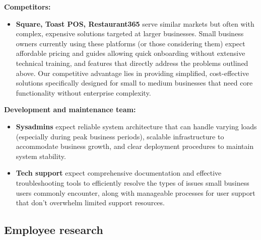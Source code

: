 \documentclass[]{VUMIFTemplateClass}
\begin{document}
\textbf{Competitors:}
\begin{itemize}
    \item \textbf{Square, Toast POS, Restaurant365} serve similar markets but
    often with complex, expensive solutions targeted at larger businesses. Small
    business owners currently using these platforms (or those considering them)
    expect affordable pricing and guides allowing quick onboarding
    without extensive technical training, and features that directly address the
    problems outlined above. Our competitive advantage lies in providing
    simplified, cost-effective solutions specifically designed for small to
    medium businesses that need core functionality without enterprise
    complexity.
\end{itemize}

\textbf{Development and maintenance team:}
\begin{itemize}
    \item \textbf{Sysadmins} expect reliable system architecture that can handle
    varying loads (especially during peak business periods), scalable
    infrastructure to accommodate business growth, and clear deployment
    procedures to maintain system stability.
    \item \textbf{Tech support} expect comprehensive documentation and effective
    troubleshooting tools to efficiently resolve the types of issues small
    business users commonly encounter, along with manageable processes for user
    support that don't overwhelm limited support resources.
\end{itemize}



\subsection{Employee research}
\end{document}
